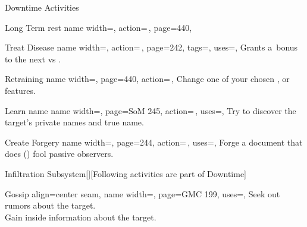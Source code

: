 \begin{PageFront}
\begin{Tables}{\frontTableHeight}
\begin{Table}{Downtime Activities}
\begin{entry}{Long Term rest}{%
                name width=\activityLength,%
                action=\,,
                page=440,
            }
            \end{entry}
            \begin{entry}{Treat Disease}{%
                name width=\activityLength,%
                action=\,,
                page=242,
                tags=\Manipulate,
                uses={\Medicine[tags=T]},
            }
                Grants a \,\Cirm bonus to the next  vs . \hfill
            \end{entry}
            \begin{entry}{Retraining}{%
                name width=\activityLength,%
                page=440,
                action=\,,
            }
                Change one of your chosen ,  or  features.\hfill
            \end{entry}
            \begin{entry}{Learn name}{%
                name width=\activityLength,%
                page=SoM 245,
                action=\,,
                uses=\Rare \Se,
            }
                Try to discover the target's private names and true name.\hfill
            \end{entry}
            \begin{entry}{Create Forgery}{%
                name width=\activityLength,%
                page=244,
                action=\,,
                uses={\Society[tags={T,S}][val=20]},
            }
                Forge a document that does {()} fool passive observers. \hfill
            \end{entry}
        \end{Table}
        \vfill
        \begin{Table}{Infiltration Subsystem}[\;\dash\;][Following activities are part of Downtime]
            \begin{entry}{Gossip}{%
                align=center seam,
                name width=\activityLength,%
                page=GMC 199,
                uses={\Diplomacy[tags=S]},
            }
                Seek out rumors about the target. \hfill
                \\
                Gain inside information about the target. \hfill

\end{entry}
\end{Table}
\end{Tables}
\end{PageFront}
